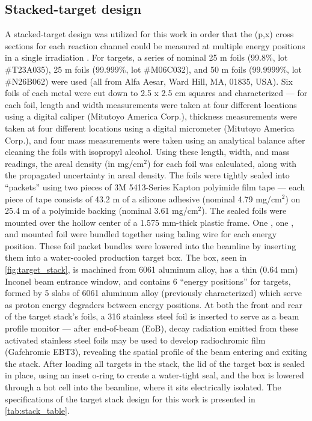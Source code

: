\documentclass[%
 reprint,
superscriptaddress,
onecolumn,
linenumbers,
notitlepage,
 amsmath,amssymb,
 aps,
prc,
]{revtex4-1}
\newcommand{\comment}[1]{\todo[color=blue!20!white,inline]{ASV: #1}}
\begin{document}
\subsection{Stacked-target design }\label{sec:target_design}


A stacked-target design was utilized for this work in order that the (p,x) cross sections for each reaction channel could be measured at multiple energy positions in a single irradiation \cite{Cumming1963}. 
For targets, a series of nominal 25 \micro m  foils (99.8\%, lot \#T23A035), 25 \micro m  foils (99.999\%, lot \#M06C032), and 50 \micro m  foils (99.9999\%, lot \#N26B062) were used (all from Alfa Aesar, Ward Hill, MA, 01835, USA).
Six foils of each metal were cut down to 2.5 x 2.5 cm squares and characterized --- for each foil, length and width measurements were taken at four different locations using a digital caliper (Mitutoyo America Corp.), thickness measurements were taken at four different locations using a digital micrometer (Mitutoyo America Corp.), and four mass measurements were taken using an analytical balance after cleaning the foils with isopropyl alcohol.
Using these length, width, and mass readings, the areal density (in mg/cm$^2$) for each foil was calculated, along with the propagated uncertainty in areal density.
The foils were tightly sealed into \enquote{packets} using two pieces of  3M 5413-Series Kapton polyimide film tape --- each piece of tape consists of 43.2 \micro m of a silicone adhesive (nominal 4.79 mg/cm$^2$) on 25.4 \micro m of a polyimide backing (nominal 3.61 mg/cm$^2$).
The sealed foils were mounted over the hollow center of a 1.575 mm-thick plastic frame.
One , one , and  mounted foil were bundled together using baling wire for each energy position.
These foil packet bundles were lowered into the beamline by inserting them into a  water-cooled production target box.
The box, seen in \autoref{fig:target_stack}, is machined from 6061 aluminum alloy, has a thin (0.64 mm) Inconel beam entrance window, and  contains 6 \enquote{energy positions} for targets, formed by  5 slabs of 6061 aluminum alloy (previously characterized) which serve as proton energy degraders  between energy positions.
At both the front and rear of the target stack's foils, a 316 stainless steel foil is inserted to serve as a beam profile monitor --- after end-of-beam (EoB), decay radiation emitted from these activated stainless steel foils may be used to develop radiochromic film (Gafchromic EBT3), revealing the spatial profile of the beam entering and exiting the stack.
After loading all targets in the stack, the lid of the target box is sealed in place, using an inset o-ring to create a water-tight seal, and the box is lowered through a hot cell into the beamline, where it sits electrically isolated.
The specifications of the target stack design for this work is presented in \autoref{tab:stack_table}.
\end{document}
